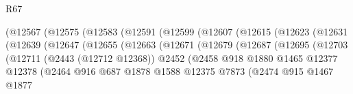 \begin{lexlean}{R67}
\begin{coremodule}
                                (@12567
                                  (@12575
                                    (@12583
                                      (@12591
                                        (@12599
                                          (@12607
                                            (@12615
                                              (@12623
                                                (@12631
                                                  (@12639
                                                    (@12647
                                                      (@12655
                                                        (@12663
                                                          (@12671
                                                            (@12679
                                                              (@12687
                                                                (@12695
                                                                  (@12703
                                                                    (@12711
                                                                      (@2443 (@12712 @12368))
                                                                      @2452
                                                                      (@2458
                                                                        @918
                                                                        @1880
                                                                        @1465
                                                                        @12377
                                                                        @12378
                                                                        (@2464
                                                                          @916
                                                                          @687
                                                                          @1878
                                                                          @1588
                                                                          @12375
                                                                          @7873
                                                                          (@2474
                                                                            @915
                                                                            @1467
                                                                            @1877

\end{coremodule}
\end{lexlean}
